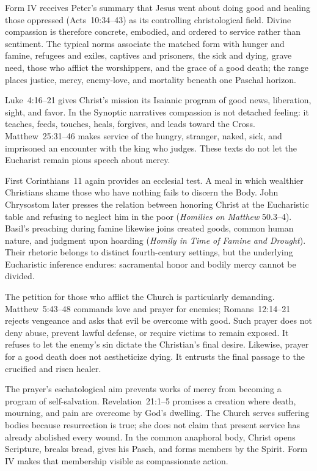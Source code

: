 Form IV receives Peter's summary that Jesus went about doing good and healing those oppressed (Acts~10:34--43) as its controlling christological field. Divine compassion is therefore concrete, embodied, and ordered to service rather than sentiment. The typical norms associate the matched form with hunger and famine, refugees and exiles, captives and prisoners, the sick and dying, grave need, those who afflict the worshippers, and the grace of a good death; the range places justice, mercy, enemy-love, and mortality beneath one Paschal horizon.

Luke~4:16--21 gives Christ's mission its Isaianic program of good news, liberation, sight, and favor. In the Synoptic narratives compassion is not detached feeling: it teaches, feeds, touches, heals, forgives, and leads toward the Cross. Matthew~25:31--46 makes service of the hungry, stranger, naked, sick, and imprisoned an encounter with the king who judges. These texts do not let the Eucharist remain pious speech about mercy.

First Corinthians~11 again provides an ecclesial test. A meal in which wealthier Christians shame those who have nothing fails to discern the Body. John Chrysostom later presses the relation between honoring Christ at the Eucharistic table and refusing to neglect him in the poor (\emph{Homilies on Matthew} 50.3--4). Basil's preaching during famine likewise joins created goods, common human nature, and judgment upon hoarding (\emph{Homily in Time of Famine and Drought}). Their rhetoric belongs to distinct fourth-century settings, but the underlying Eucharistic inference endures: sacramental honor and bodily mercy cannot be divided.

The petition for those who afflict the Church is particularly demanding. Matthew~5:43--48 commands love and prayer for enemies; Romans~12:14--21 rejects vengeance and asks that evil be overcome with good. Such prayer does not deny abuse, prevent lawful defense, or require victims to remain exposed. It refuses to let the enemy's sin dictate the Christian's final desire. Likewise, prayer for a good death does not aestheticize dying. It entrusts the final passage to the crucified and risen healer.

The prayer's eschatological aim prevents works of mercy from becoming a program of self-salvation. Revelation~21:1--5 promises a creation where death, mourning, and pain are overcome by God's dwelling. The Church serves suffering bodies because resurrection is true; she does not claim that present service has already abolished every wound. In the common anaphoral body, Christ opens Scripture, breaks bread, gives his Pasch, and forms members by the Spirit. Form IV makes that membership visible as compassionate action.

